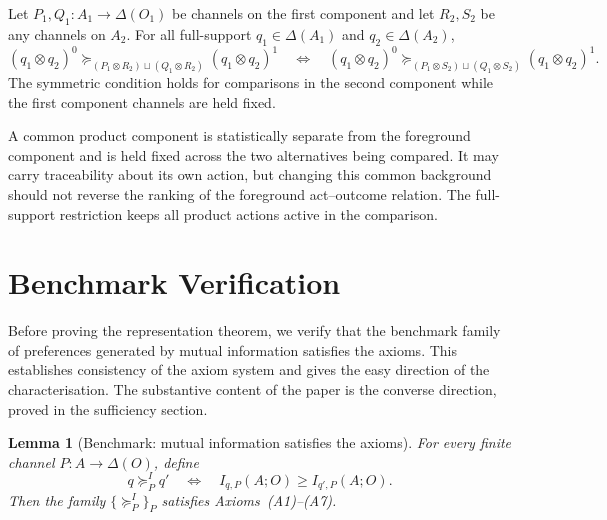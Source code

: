 \documentclass[11pt,a4paper]{article}
\newtheorem{lemma}[theorem]{Lemma}
\theoremstyle{definition}
\newcommand{\1}{\mathbf 1}
\begin{document}
\begin{description}[leftmargin=*,style=sameline]
\item[(A7) Independent-background separability.]
Let $P_1,Q_1:A_1\to\Delta(O_1)$ be channels on the first component and let $R_2,S_2$ be any channels on $A_2$.  For all
full-support $q_1\in\Delta(A_1)$ and $q_2\in\Delta(A_2)$,
\[
(q_1\otimes q_2)^0
\succeq_{(P_1\otimes R_2)\sqcup(Q_1\otimes R_2)}
(q_1\otimes q_2)^1
\quad\Longleftrightarrow\quad
(q_1\otimes q_2)^0
\succeq_{(P_1\otimes S_2)\sqcup(Q_1\otimes S_2)}
(q_1\otimes q_2)^1.
\]
The symmetric condition holds for comparisons in the second component while the first component channels are held fixed.

A common product component is statistically separate from the foreground component and is held fixed across the two
alternatives being compared.  It may carry traceability about its own action, but changing this common background should
not reverse the ranking of the foreground act--outcome relation.  The full-support restriction keeps all product actions
active in the comparison.

\end{description}

\section*{Benchmark Verification}

Before proving the representation theorem, we verify that the benchmark family of preferences generated by mutual
information satisfies the axioms.  This establishes consistency of the axiom system and gives the easy direction of the
characterisation.  The substantive content of the paper is the converse direction, proved in the sufficiency section.

\begin{lemma}[Benchmark: mutual information satisfies the axioms]\label{lem:MIbenchmark}
For every finite channel $P:A\to\Delta(O)$, define
\[
q\succeq^I_P q'
\quad\Longleftrightarrow\quad
I_{q,P}(A;O)\ge I_{q',P}(A;O).
\]
Then the family $\{\succeq^I_P\}_P$ satisfies Axioms~\textup{(A1)--(A7)}.
\end{lemma}
\end{document}
